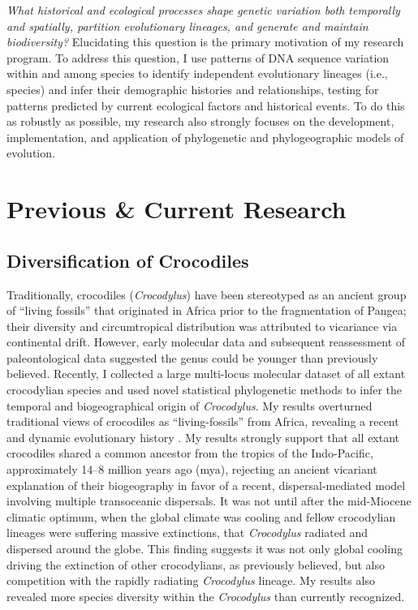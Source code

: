 \documentclass[10pt]{article}
\begin{document}
\raggedright
\singlespacing

\emph{What historical and ecological processes shape genetic variation both temporally and spatially, partition evolutionary lineages, and generate and maintain biodiversity?}
Elucidating this question is the primary motivation of my research program.
To address this question, I use patterns of DNA sequence variation within and among species to identify independent evolutionary lineages (i.e., species) and infer their demographic histories and relationships, testing for patterns predicted by current ecological factors and historical events.
To do this as robustly as possible, my research also strongly focuses on the development, implementation, and application of phylogenetic and phylogeographic models of evolution.

\section*{Previous \& Current Research}
\subsection*{Diversification of Crocodiles}
Traditionally, crocodiles (\emph{Crocodylus}) have been stereotyped as an ancient group of ``living fossils'' that originated in Africa prior to the fragmentation of Pangea; their diversity and circumtropical distribution was attributed to vicariance via continental drift.
However, early molecular data and subsequent reassessment of paleontological data suggested the genus could be younger than previously believed.
Recently, I collected a large multi-locus molecular dataset of all extant crocodylian species and used novel statistical phylogenetic methods to infer the temporal and biogeographical origin of \emph{Crocodylus}.
My results overturned traditional views of crocodiles as ``living-fossils'' from Africa, revealing a recent and dynamic evolutionary history \cite{Oaks2011}.
My results strongly support that all extant crocodiles shared a common ancestor from the tropics of the Indo-Pacific, approximately 14--8 million years ago (mya), rejecting an ancient vicariant explanation of their biogeography in favor of a recent, dispersal-mediated model involving multiple transoceanic dispersals.
It was not until after the mid-Miocene climatic optimum, when the global climate was cooling and fellow crocodylian lineages were suffering massive extinctions, that \emph{Crocodylus} radiated and dispersed around the globe.
This finding suggests it was not only global cooling driving the extinction of other crocodylians, as previously believed, but also competition with the rapidly radiating \emph{Crocodylus} lineage.
My results also revealed more species diversity within the \emph{Crocodylus} than currently recognized.
\end{document}
